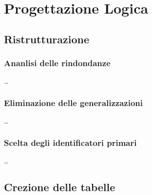 \documentclass[11pt]{article}
\begin{document}
\section{Progettazione Logica}

\subsection{Ristrutturazione}

\subsubsection{Ananlisi delle rindondanze}

\dots

\subsubsection{Eliminazione delle generalizzazioni}

\dots

\subsubsection{Scelta degli identificatori primari}

\dots

\subsection{Crezione delle tabelle}
\end{document}
